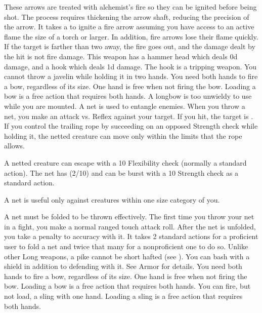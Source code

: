          These arrows are treated with alchemist's fire so they can be ignited before being shot.
        The process requires thickening the arrow shaft, reducing the precision of the arrow.
        It takes a  to ignite a fire arrow assuming you have access to an active flame the size of a torch or larger.
        In addition, fire arrows lose their flame quickly.
        If the target is farther than two  away, the fire goes out, and the damage dealt by the hit is not fire damage.
         This weapon has a hammer head which deals \plus0d damage, and a hook which deals \minus1d damage. The hook is a tripping weapon.
         You cannot throw a javelin while holding it in two hands.
         You need both hands to fire a bow, regardless of its size. One hand is free when not firing the bow. Loading a bow is a free action that requires both hands. A longbow is too unwieldy to use while you are mounted.
         A net is used to entangle enemies. When you throw a net, you make an attack vs. Reflex against your target. If you hit, the target is \slowed. If you control the trailing rope by succeeding on an opposed Strength check while holding it, the netted creature can move only within the limits that the rope allows.
        \par A netted creature can escape with a  10 Flexibility check (normally a standard action). The net has (2/10) and can be burst with a  10 Strength check as a standard action.
        \par A net is useful only against creatures within one size category of you.
        \par A net must be folded to be thrown effectively. The first time you throw your net in a fight, you make a normal ranged touch attack roll. After the net is unfolded, you take a  penalty to accuracy with it. It takes 2 standard actions for a proficient user to fold a net and twice that many for a nonproficient one to do so.
         Unlike other Long weapons, a pike cannot be short hafted (see ).
         You can bash with a shield in addition to defending with it. See Armor for details.
         You need both hands to fire a bow, regardless of its size. One hand is free when not firing the bow. Loading a bow is a free action that requires both hands.
         You can fire, but not load, a sling with one hand. Loading a sling is a free action that requires both hands.
